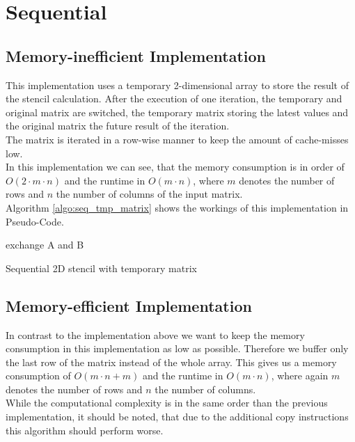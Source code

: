 \documentclass[11pt,a4paper]{article}
\begin{document}
\section{Sequential} \label{section:sequential}
\subsection{Memory-inefficient Implementation}
This implementation uses a temporary 2-dimensional array to store the result of the stencil calculation. After the execution of one iteration, the temporary and original matrix are switched, the temporary matrix storing the latest values and the original matrix the future result of the iteration.\\
The matrix is iterated in a row-wise manner to keep the amount of cache-misses low.\\
In this implementation we can see, that the memory consumption is in order of $O(2 \cdot m \cdot n)$ and the runtime in $O(m \cdot n)$, where $m$ denotes the number of rows and $n$ the number of columns of the input matrix.\\
Algorithm \ref{algo:seq_tmp_matrix} shows the workings of this implementation in Pseudo-Code.

\begin{algorithm}[H] \label{algo:seq_tmp_matrix}
 
  {
  exchange A and B
 }
 \caption{Sequential 2D stencil with temporary matrix}
\end{algorithm}

\subsection{Memory-efficient Implementation} \label{subsec:seq2}
In contrast to the implementation above we want to keep the memory consumption in this implementation as low as possible. Therefore we buffer only the last row of the matrix instead of the whole array. This gives us a memory consumption of $O(m \cdot n + m)$ and the runtime in $O(m \cdot n)$, where again $m$ denotes the number of rows and $n$ the number of columns.\\
While the computational complexity is in the same order than the previous implementation, it should be noted, that due to the additional copy instructions this algorithm should perform worse.\\
\end{document}
